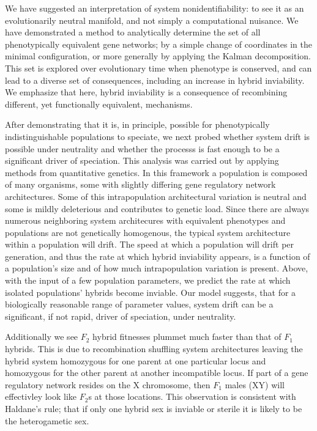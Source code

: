 \documentclass{article}
\newcommand{\plr}[1]{\todo[color=blue!25]{#1}}
\newcommand{\plr}[1]{{\color{blue}\it #1}}
\newcommand{\1}{\mathbbm{1}}
\begin{document}
We have suggested an interpretation of system nonidentifiability: to see it as an evolutionarily neutral manifold, and not simply a computational nuisance. 
We have demonstrated a method to analytically determine the set of all phenotypically equivalent gene networks; 
by a simple change of coordinates in the minimal configuration, or more generally by applying the Kalman decomposition.
This set is explored over evolutionary time when phenotype is conserved, and can lead to a diverse set of consequences, 
including an increase in hybrid inviability.
We emphasize that here, hybrid inviability is a consequence of recombining different, yet functionally equivalent, mechanisms.
\plr{See refs in Barton 2010 paper.}

After demonstrating that it is, in principle, possible for phenotypically indistinguishable populations to speciate, we next probed whether system drift is possible under neutrality and whether the processs is fast enough to be a significant driver of speciation. This analysis was carried out by applying methods from quantitative genetics. In this framework a population is composed of many organisms, some with slightly differing gene regulatory network architectures. Some of this intrapopulation architectural variation is neutral and some is mildly deleterious and contributes to genetic load. Since there are always numerous neighboring system architecures with equivalent phenotypes and populations are not genetically homogenous, the typical system architecture within a population will drift. The speed at which a population will drift per generation, and thus the rate at which hybrid inviability appears, is a function of a population's size and of how much intrapopulation variation is present. Above, with the input of a few population parameters, we predict the rate at which isolated populations' hybrids become inviable. Our model suggests, that for a biologically reasonable range of parameter values, system drift can be a significant, if not rapid, driver of speciation, under neutrality.

Additionally we see $F_2$ hybrid fitnesses plummet much faster than that of $F_1$ hybrids. 
This is due to recombination shuffling system architectures leaving the hybrid system homozygous for one parent at one particular locus and homozygous for the other parent at another incompatible locus. If part of a gene regulatory network resides on the X chromosome, then $F_1$ males (XY) will effectivley look like $F_2$s at those locations. This observation is consistent with Haldane's rule; that if only one hybrid sex is inviable or sterile it is likely to be the heterogametic sex.
\end{document}
